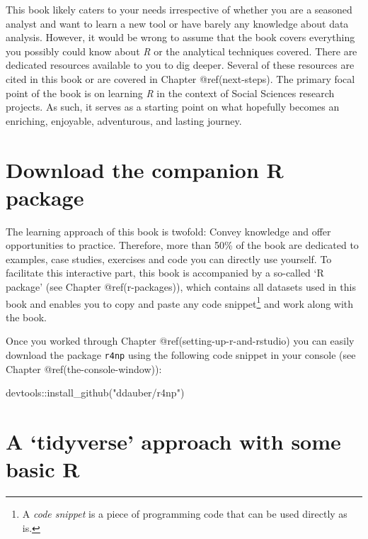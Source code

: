 \documentclass[
  letterpaper,
]{krantz}
\makeatletter
\newenvironment{Shaded}{\begin{snugshade}}{\end{snugshade}}
\newcommand{\FunctionTok}[1]{\textcolor[rgb]{0.28,0.35,0.67}{#1}}
\newcommand{\NormalTok}[1]{\textcolor[rgb]{0.00,0.23,0.31}{#1}}
\newcommand{\SpecialCharTok}[1]{\textcolor[rgb]{0.37,0.37,0.37}{#1}}
\newcommand{\StringTok}[1]{\textcolor[rgb]{0.13,0.47,0.30}{#1}}
\newenvironment{kframe}{%
\medskip{}
\setlength{\fboxsep}{.8em}
 \def\at@end@of@kframe{}%
 \ifinner\ifhmode%
  \def\at@end@of@kframe{\end{minipage}}%
  \begin{minipage}{\columnwidth}%
 \fi\fi%
 \def\FrameCommand##1{\hskip\@totalleftmargin \hskip-\fboxsep
 \colorbox{shadecolor}{##1}\hskip-\fboxsep
     \hskip-\linewidth \hskip-\@totalleftmargin \hskip\columnwidth}%
 \MakeFramed {\advance\hsize-\width
   \@totalleftmargin\z@ \linewidth\hsize
   \@setminipage}}%
 {\par\unskip\endMakeFramed%
 \at@end@of@kframe}
\renewenvironment{Shaded}{\begin{kframe}}{\end{kframe}}
\makeatother
\begin{document}
This book likely caters to your needs irrespective of whether you are a
seasoned analyst and want to learn a new tool or have barely any
knowledge about data analysis. However, it would be wrong to assume that
the book covers everything you possibly could know about \emph{R} or the
analytical techniques covered. There are dedicated resources available
to you to dig deeper. Several of these resources are cited in this book
or are covered in Chapter @ref(next-steps). The primary focal point of
the book is on learning \emph{R} in the context of Social Sciences
research projects. As such, it serves as a starting point on what
hopefully becomes an enriching, enjoyable, adventurous, and lasting
journey.

\section{Download the companion R
package}\label{download-the-companion-r-package}

The learning approach of this book is twofold: Convey knowledge and
offer opportunities to practice. Therefore, more than 50\% of the book
are dedicated to examples, case studies, exercises and code you can
directly use yourself. To facilitate this interactive part, this book is
accompanied by a so-called `R package' (see Chapter @ref(r-packages)),
which contains all datasets used in this book and enables you to copy
and paste any code snippet\footnote{A \emph{code snippet} is a piece of
  programming code that can be used directly as is.} and work along with
the book.

Once you worked through Chapter @ref(setting-up-r-and-rstudio) you can
easily download the package \texttt{r4np} using the following code
snippet in your console (see Chapter @ref(the-console-window)):

\begin{Shaded}
\begin{Highlighting}[]
\NormalTok{devtools}\SpecialCharTok{::}\FunctionTok{install\_github}\NormalTok{(}\StringTok{"ddauber/r4np"}\NormalTok{)}
\end{Highlighting}
\end{Shaded}

\section{A `tidyverse' approach with some basic
R}\label{a-tidyverse-approach-with-some-basic-r}
\end{document}
